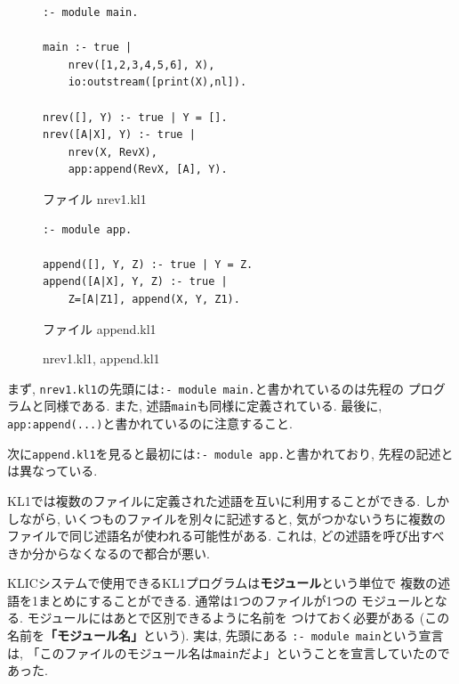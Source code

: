 \documentclass[a4,titlepage]{jsreport}
\begin{document}
\begin{figure}
\begin{center}
\begin{minipage}{7cm}
\begin{Verbatim}[frame=single,baselinestretch=0.8]
:- module main.

main :- true |
    nrev([1,2,3,4,5,6], X),
    io:outstream([print(X),nl]).

nrev([], Y) :- true | Y = [].
nrev([A|X], Y) :- true |
    nrev(X, RevX),
    app:append(RevX, [A], Y).
\end{Verbatim}
\begin{center}
ファイル nrev1.kl1
\end{center}
\end{minipage}
\hfil
\begin{minipage}{7.5cm}
\begin{Verbatim}[frame=single,baselinestretch=0.8]
:- module app.

append([], Y, Z) :- true | Y = Z.
append([A|X], Y, Z) :- true |
    Z=[A|Z1], append(X, Y, Z1).
\end{Verbatim}
\begin{center}
ファイル append.kl1
\end{center}
\end{minipage}
\caption{nrev1.kl1, append.kl1}
\label{fig:bar}
\end{center}
\vspace*{-18pt}
\end{figure}

まず, \verb|nrev1.kl1|の先頭には\verb|:- module main.|と書かれているのは先程の
プログラムと同様である.  また, 述語\verb|main|も同様に定義されている.  
最後に, \verb|app:append(...)|と書かれているのに注意すること.  

次に\verb|append.kl1|を見ると最初には\verb|:- module app.|と書かれており, 
先程の記述とは異なっている.  

KL1では複数のファイルに定義された述語を互いに利用することができる.  
しかしながら, いくつものファイルを別々に記述すると, 
気がつかないうちに複数のファイルで同じ述語名が使われる可能性がある.  
これは, どの述語を呼び出すべきか分からなくなるので都合が悪い.  

KLICシステムで使用できるKL1プログラムは{\bf モジュール}という単位で
複数の述語を1まとめにすることができる.  
通常は1つのファイルが1つの
モジュールとなる.  
モジュールにはあとで区別できるように名前を
つけておく必要がある (この名前を{\bf 「モジュール名」}という).  
実は, 先頭にある \verb|:- module main|という宣言は, 
「このファイルのモジュール名は\verb|main|だよ」ということを宣言していたので
あった.  
\end{document}
